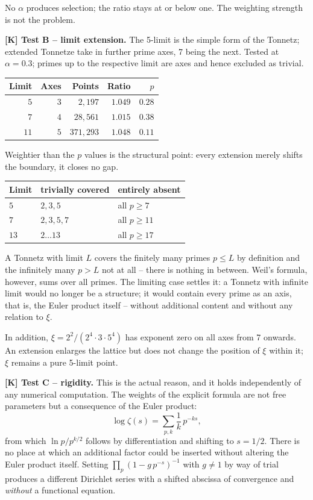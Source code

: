 No $\alpha$ produces selection; the ratio stays at or below one. The
weighting strength is not the problem.

\textbf{[K] Test B -- limit extension.} The 5-limit is the simple form
of the Tonnetz; extended Tonnetze take in further prime axes, 7 being
the next. Tested at $\alpha = 0.3$; primes up to the respective limit
are axes and hence excluded as trivial.

\begin{center}
\begin{tabular}{rrrrr}
\toprule
Limit & Axes & Points & Ratio & $p$ \\
\midrule
$5$ & $3$ & $2{,}197$ & $1.049$ & $0.28$ \\
$7$ & $4$ & $28{,}561$ & $1.015$ & $0.38$ \\
$11$ & $5$ & $371{,}293$ & $1.048$ & $0.11$ \\
\bottomrule
\end{tabular}
\end{center}

Weightier than the $p$ values is the structural point: every extension
merely shifts the boundary, it closes no gap.

\begin{center}
\begin{tabular}{lll}
\toprule
Limit & trivially covered & entirely absent \\
\midrule
$5$ & $2, 3, 5$ & all $p \ge 7$ \\
$7$ & $2, 3, 5, 7$ & all $p \ge 11$ \\
$13$ & $2 \ldots 13$ & all $p \ge 17$ \\
\bottomrule
\end{tabular}
\end{center}

A Tonnetz with limit $L$ covers the finitely many primes $p \le L$ by
definition and the infinitely many $p > L$ not at all -- there is
nothing in between. Weil's formula, however, sums over all primes. The
limiting case settles it: a Tonnetz with infinite limit would no longer
be a structure; it would contain every prime as an axis, that is, the
Euler product itself -- without additional content and without any
relation to $\xi$.

In addition, $\xi = 2^2/(2^4\cdot 3\cdot 5^4)$ has exponent zero on all
axes from 7 onwards. An extension enlarges the lattice but does not
change the position of $\xi$ within it; $\xi$ remains a pure 5-limit
point.

\textbf{[K] Test C -- rigidity.} This is the actual reason, and it holds
independently of any numerical computation. The weights of the explicit
formula are not free parameters but a consequence of the Euler product:
\[
  \log\zeta(s) = \sum_{p,k} \frac1k\,p^{-ks},
\]
from which $\ln p / p^{k/2}$ follows by differentiation and shifting to
$s = 1/2$. There is no place at which an additional factor could be
inserted without altering the Euler product itself. Setting
$\prod_p (1 - g\,p^{-s})^{-1}$ with $g \neq 1$ by way of trial produces
a different Dirichlet series with a shifted abscissa of convergence and
\emph{without} a functional equation.

